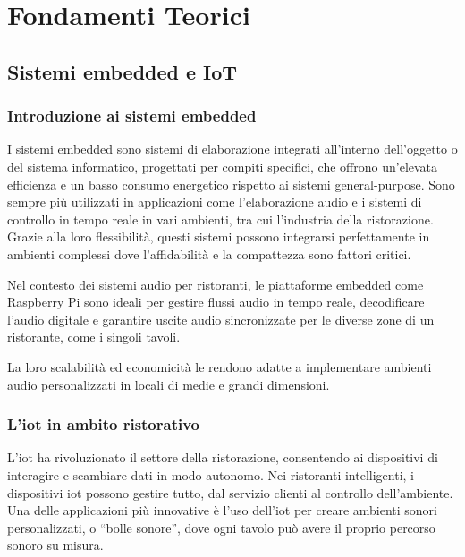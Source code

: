 
%

\chapter{Fondamenti Teorici}
\label{cha:introduzione}


\section{Sistemi embedded e IoT}

\subsection{Introduzione ai sistemi embedded}
\noindent

I sistemi embedded sono sistemi di elaborazione integrati all'interno dell'oggetto o del sistema informatico, progettati per compiti specifici, che offrono un'elevata efficienza e un basso consumo energetico rispetto ai sistemi general-purpose. Sono sempre più utilizzati in applicazioni come l'elaborazione audio e i sistemi di controllo in tempo reale in vari ambienti, tra cui l'industria della ristorazione. Grazie alla loro flessibilità, questi sistemi possono integrarsi perfettamente in ambienti complessi dove l'affidabilità e la compattezza sono fattori critici.

Nel contesto dei sistemi audio per ristoranti, le piattaforme embedded come Raspberry Pi sono ideali per gestire flussi audio in tempo reale, decodificare l'audio digitale e garantire uscite audio sincronizzate per le diverse zone di un ristorante, come i singoli tavoli.

La loro scalabilità ed economicità le rendono adatte a implementare ambienti audio personalizzati in locali di medie e grandi dimensioni.


\subsection{L'\gls{iot} in ambito ristorativo}
\noindent

L'\gls{iot} ha rivoluzionato il settore della ristorazione, consentendo ai dispositivi di interagire e scambiare dati in modo autonomo. Nei ristoranti intelligenti, i dispositivi \gls{iot} possono gestire tutto, dal servizio clienti al controllo dell'ambiente. Una delle applicazioni più innovative è l'uso dell'\gls{iot} per creare ambienti sonori personalizzati, o “bolle sonore”, dove ogni tavolo può avere il proprio percorso sonoro su misura.

